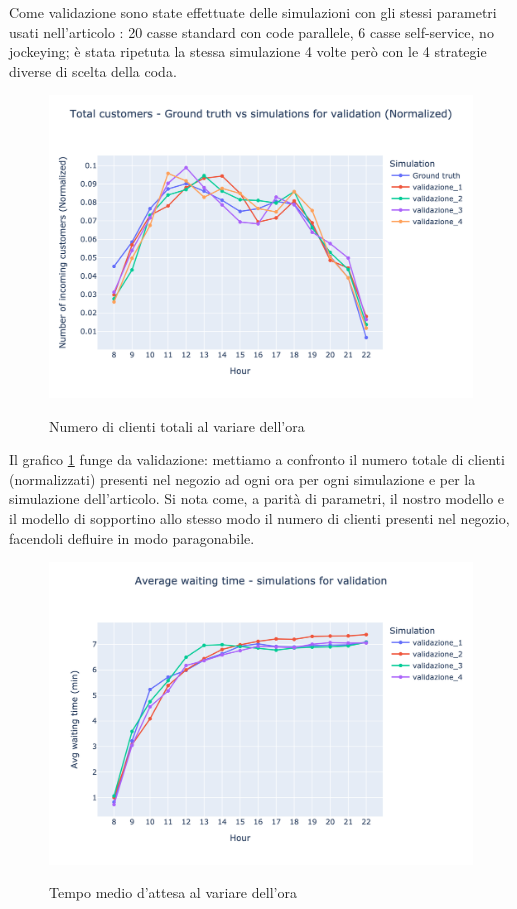 Come validazione sono state effettuate delle simulazioni con gli stessi parametri usati nell'articolo \cite{article1}: 20 casse standard con code parallele, 6 casse self-service, no jockeying; è stata ripetuta la stessa simulazione 4 volte però con le 4 strategie diverse di scelta della coda.

\begin{figure}[H]
	\centering
	\includegraphics[width=12cm]{"images/results/total_customers_validation.png"}
	\label{fig:total_customers_validation}
	\caption{Numero di clienti totali al variare dell'ora}
\end{figure}

Il grafico \ref{fig:total_customers_validation} funge da validazione: mettiamo a confronto il numero totale di clienti (normalizzati) presenti nel negozio ad ogni ora per ogni simulazione e per la simulazione dell'articolo. Si nota come, a parità di parametri, il nostro modello e il modello di \cite{article1} sopportino allo stesso modo il numero di clienti presenti nel negozio, facendoli defluire in modo paragonabile.

\begin{figure}[H]
	\centering
	\includegraphics[width=12cm]{"images/results/avg_wt_validation.png"}
	\label{fig:avg_wt_validation}
	\caption{Tempo medio d'attesa al variare dell'ora}
\end{figure}


